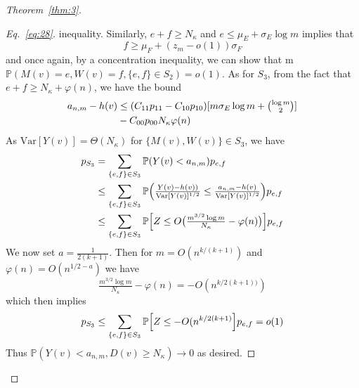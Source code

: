 \documentclass[draftcls]{IEEEtran}
\theoremstyle{definition}
\begin{document}
\begin{proof}[Theorem~\ref{thm:3}]
\begin{proof}[Eq.~\eqref{eq:28}]
inequality. Similarly, $e + f \geq N_{\kappa}$ and $e \leq \mu_{E}
+ \sigma_{E} \log{m}$ implies that
\begin{equation}
  \label{eq:33}
  f \geq \mu_{F} + (z_{m} - o(1)) \sigma_F 
\end{equation}
and once again, by a concentration inequality, we can show that m
$\mathbb{P}(M(v) = e, W(v) = f, \{e,f\} \in S_2) = o(1)$. As for
$S_3$, from the fact that $e + f \geq N_{\kappa} + \varphi(n)$, we have the bound
  \begin{equation}
    \begin{split}
    a_{n,m} - h(v) &\leq (C_{11} p_{11} - C_{10} p_{10})[m \sigma_E
    \log{m} + \tbinom{\log{m}}{2}] \\ &- C_{00}p_{00} N_\kappa \varphi(n)
    \end{split}
  \end{equation}
  As $\mathrm{Var}[Y(v)] = \Theta(N_\kappa)$ for $\{M(v), W(v)\} \in
  S_3$, we have
  \begin{equation}
    \label{eq:39}
    \begin{split}
      p_{S_3} &= \sum_{\{e,f\} \in S_3} \mathbb{P}( Y(v) < a_{n,m}) p_{e,f} 
      \\ &\leq \sum_{\{e,f\} \in S_3} \mathbb{P}\Bigl(\tfrac{Y(v) - h(v))}{\mathrm{Var}[Y(v)]^{1/2}} \leq \tfrac{a_{n,m} -
      h(v)}{\mathrm{Var}[Y(v)]^{1/2}}\Bigr)p_{e,f} \\
    &\leq \sum_{\{e,f\} \in S_3} \mathbb{P}\Bigl[Z \leq
    O\bigl(\tfrac{m^{3/2} \log m}{N_{\kappa}} - \varphi(n)\bigr)\Bigr] p_{e,f}
    \end{split}
  \end{equation}
  We now set $a = \tfrac{1}{2(k+1)}$. Then for $m =
  O(n^{k/(k+1)})$ and $\varphi(n) = O(n^{1/2 - a})$ we have
  \begin{equation}
    \label{eq:41}
    \tfrac{m^{3/2} \log m}{N_\kappa} - \varphi(n) =
    -O(n^{k/2(k+1))})
  \end{equation}
  which then implies
  \begin{equation}
    \label{eq:27}
    p_{S_3} \leq \sum_{\{e,f\} \in S_3} \mathbb{P} \Bigl[Z \leq
    - O(n^{k/2(k+1)}\Bigr] p_{e,f} = o(1)
  \end{equation}
  Thus $\mathbb{P}(Y(v) < a_{n,m}, D(v) \geq
      N_{\kappa}) \rightarrow 0$ as desired.
\end{proof}

\end{proof}

\end{document}
